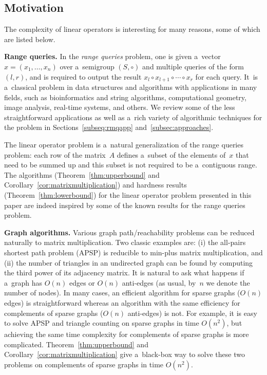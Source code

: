 \documentclass[review,onefignum,onetabnum]{siamart190516}
\begin{document}
\subsection{Motivation}
The complexity of linear operators is interesting for many reasons, some of
which are listed below.

\textbf{Range queries.} In the \emph{range queries} problem,
one is given a~vector~$x=(x_1, \dotsc, x_n)$ over a~semigroup $(S, \circ)$ and
multiple queries of the form~$(l,r)$, and is required to
output the result $x_l \circ x_{l+1} \circ \dotsb \circ x_r$
for each query. It~is a~classical problem in data structures and
algorithms with applications in many fields, such as bioinformatics and
string algorithms, computational geometry, image analysis, real-time
systems, and others.
We review some of the less straightforward applications
as well as a~rich variety of algorithmic techniques for the problem in
Sections~\ref{subseq:rmqapp} and~\ref{subsec:approaches}.

The linear operator problem is a~natural generalization of the range queries
problem: each row of the matrix~$A$ defines a~subset of the elements of~$x$
that need to be summed up and this subset is not required to be
a~contiguous range. The algorithms (Theorem~\ref{thm:upperbound} and
Corollary~\ref{cor:matrixmultiplication}) and hardness results
(Theorem~\ref{thm:lowerbound}) for the linear operator problem presented in this
paper are indeed inspired by some of the known results for the range queries
problem.

\textbf{Graph algorithms.} Various graph path/reachability
problems can be reduced naturally to matrix multiplication.
Two classic examples are: (i) the all-pairs shortest path problem (APSP) is
reducible to min-plus matrix multiplication, and (ii) the number of triangles
in an undirected graph can be found by computing the third power of its
adjacency matrix.
It is natural to ask what happens if
a~graph has $O(n)$ edges or $O(n)$ anti-edges
(as usual, by~$n$ we denote the number of nodes).
In many cases, an efficient algorithm
for sparse graphs ($O(n)$ edges) is straightforward
whereas an algorithm with the same efficiency
for complements of sparse graphs ($O(n)$ anti-edges) is not. For
example, it is easy to solve APSP and triangle counting on sparse graphs in
time $O(n^2)$, but achieving the same time complexity for complements of sparse
graphs is more complicated.
Theorem~\ref{thm:upperbound} and Corollary~\ref{cor:matrixmultiplication} give
a~black-box way to solve these two problems on complements of sparse graphs in
time $O(n^2)$.
\end{document}
